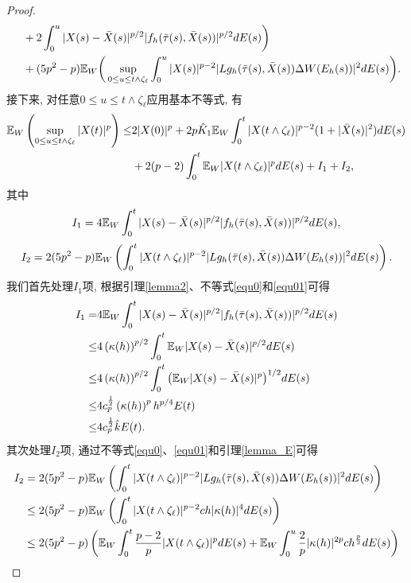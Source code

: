 \begin{proof}
\begin{align*}
    \quad&+2\int_{0}^{u}{|X(s)-\bar{X}(s)|^{p/2}|f_{h}(\bar{\tau}(s),\bar{X}(s))|^{p/2}dE(s)}\bigg)\\
    \quad& +(5p^{2}-p)\mathbb{E}_W\bigg(\sup_{0\leq u\leq t\wedge \zeta_{\ell}}\int_{0}^{u}{|X(s)|^{p-2}|Lg_{h}(\bar{\tau}(s),\bar{X}(s))\Delta W(E_{h}(s))|^2dE(s)}\bigg).\\
\end{align*}
接下来, 对任意$0\leq u\leq t\wedge \zeta_{\ell}$应用基本不等式, 有
 \begin{align}
    \mathbb{E}_W\left(\sup_{0\leq u\leq t\wedge \zeta_{\ell}}|X(t)|^p\right)\leq & 2|X(0)|^p +2p\hat{K}_1\mathbb{E}_W\int_{0}^{t}|X(t\wedge \zeta_{\ell})|^{p-2}(1+|\bar{X}(s)|^2)dE(s) \nonumber\\
    \quad& +2(p-2)\int_{0}^{t}\mathbb{E}_W |X(t\wedge \zeta_{\ell})|^p dE(s)+I_{1}+I_{2},
\end{align}
其中
\begin{align*}
    I_{1}=4\mathbb{E}_W\int_{0}^{t}{|X(s)-\bar{X}(s)|^{p/2}|f_{h}(\bar{\tau}(s),\bar{X}(s))|^{p/2}dE(s)},
\end{align*}
\begin{align*}
    I_{2}=2(5p^{2}-p)\mathbb{E}_W\left(\int_{0}^{t}{|X(t\wedge \zeta_{\ell})|^{p-2}|Lg_{h}(\bar{\tau}(s),\bar{X}(s))\Delta W(E_{h}(s))|^2dE(s)}\right).
\end{align*}
 我们首先处理$I_{1}$项, 根据引理\ref{lemma2}、不等式\eqref{equ0}和\eqref{equ01}可得
   \begin{align*}
      I_{1}=&4\mathbb{E}_W\int_{0}^{t}{|X(s)-\bar{X}(s)|^{p/2}|f_{h}(\bar{\tau}(s),\bar{X}(s))|^{p/2}dE(s)}\\
      \leq& 4\left(\kappa(h)\right)^{p/2}\int_{0}^{t}{\mathbb{E}_W|X(s)-\bar{X}(s)|^{p/2}dE(s)}\\
      \leq& 4\left(\kappa(h)\right)^{p/2}\int_{0}^{t}{\big(\mathbb{E}_W|X(s)-\bar{X}(s)|^p\big)^{1/2}dE(s)}\\
      \leq& 4c_{p}^{\frac{1}{2}}\left(\kappa(h)\right)^ph^{p/4}E(t)\\
      \leq& 4c_{p}^{\frac{1}{2}}\hat{k}E(t).
  \end{align*}
其次处理$I_{2}$项, 通过不等式\eqref{equ0}、\eqref{equ01}和引理\ref{lemma_E}可得
\begin{align*}
    I_{2}&=2(5p^{2}-p)\EE_W\left(\int_{0}^{t}{|X(t\wedge \zeta_{\ell})|^{p-2}|Lg_{h}(\bar{\tau}(s),\bar{X}(s))\Delta W(E_{h}(s))|^2dE(s)}\right)\\
    &\leq2(5p^{2}-p)\EE_W\left(\int_{0}^{t}{|X(t\wedge \zeta_{\ell})|^{p-2}ch|\k(h)|^4 dE(s)}\right)\\
    &\leq2(5p^{2}-p)\left(\EE_W\int_{0}^{t}{\frac{p-2}{p}|X(t\wedge \zeta_{\ell})|^{p}dE(s)}+\EE_W\int_{0}^{u}{\frac{2}{p}|\k(h)|^{2p}ch^{\frac{p}{2}} dE(s)}\right)\\

\end{align*}
\end{proof}
